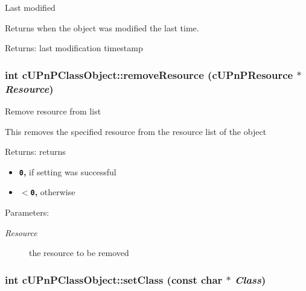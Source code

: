 Last modified

Returns when the object was modified the last time.

\begin{Desc}
\item[Returns:]last modification timestamp \end{Desc}
\hypertarget{classcUPnPClassObject_5df5b5c205aaaeea44a1e5d03b7cba23}{
\subsubsection[{removeResource}]{\setlength{\rightskip}{0pt plus 5cm}int cUPnPClassObject::removeResource ({\bf cUPnPResource} $\ast$ {\em Resource})}}
\label{classcUPnPClassObject_5df5b5c205aaaeea44a1e5d03b7cba23}


Remove resource from list

This removes the specified resource from the resource list of the object

\begin{Desc}
\item[Returns:]returns\begin{itemize}
\item {\bf {\tt 0},} if setting was successful\item {\bf {\tt $<$0},} otherwise \end{itemize}
\end{Desc}
\begin{Desc}
\item[Parameters:]
\begin{description}
\item[{\em Resource}]the resource to be removed \end{description}
\end{Desc}
\hypertarget{classcUPnPClassObject_980233a73fe6b3286313f992909602ae}{
\subsubsection[{setClass}]{\setlength{\rightskip}{0pt plus 5cm}int cUPnPClassObject::setClass (const char $\ast$ {\em Class})}}
\label{classcUPnPClassObject_980233a73fe6b3286313f992909602ae}


